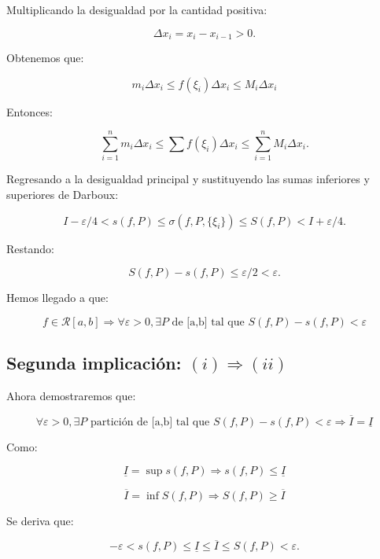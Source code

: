\documentclass[a4paper,12pt]{article}
\begin{document}
	
	

	Multiplicando la desigualdad por la cantidad positiva:
	
	
	\[
\Delta x_i = x_i - x_{i-1} > 0.
	\]
	
	
	
	Obtenemos que:
	
	\[
	m_i \Delta x_i \leq f(\xi_i) \Delta x_i \leq M_i \Delta x_i
	\]
	
	Entonces:
	
	
	\[
	\sum_{i=1}^{n} m_i \Delta x_i \leq \sum f(\xi_i) \Delta x_i \leq \sum_{i=1}^{n} M_i \Delta x_i.
	\]
	
	
	
	Regresando a la desigualdad principal y sustituyendo las sumas inferiores y superiores de Darboux:
	
	
	
	\[
	I - \varepsilon/4 < s(f, P) \leq \sigma(f, P, \{\xi_i\}) \leq S(f, P) < I + \varepsilon/4.
	\]
	
	
	
	Restando:
	
	
	
	\[
	S(f, P) - s(f, P) \leq \varepsilon/2 < \varepsilon.
	\]
	
	Hemos llegado a que:
	
	\[
	f \in \mathcal{R}[a,b] \Rightarrow \forall \varepsilon > 0, \exists P \text{ de [a,b] tal que  }   S(f,P) - s(f,P) < \varepsilon
	\]
	
	
	\subsection{Segunda implicación: $ (i) \Rightarrow (ii) $ }
	
	
	Ahora demostraremos que:
	
	\[
	\forall \varepsilon > 0, \exists P \text{ partición de [a,b] tal que }  S(f,P) - s(f,P) < \varepsilon \Rightarrow \overline{I} = \underline{I}
	\]
	
	
	Como:
	
	
	
	\[
	\underline{I} = \sup s(f, P) \Longrightarrow s(f,P) \leq \underline{I}
	\]
	
	
	\[
	\overline{I} = \inf S(f, P) \Longrightarrow S(f,P) \geq \overline{I}
	\]
	
	
	
	Se deriva que:
	
	
	
	\[
	- \varepsilon < s(f, P) \leq \underline{I} \leq \overline{I} \leq S(f, P) < \varepsilon.
	\]
	
\end{document}
